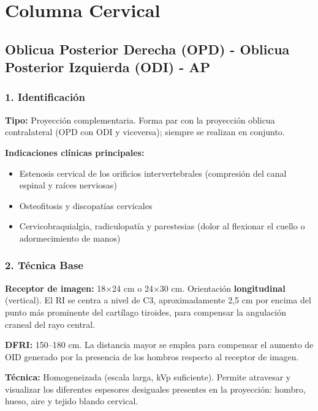 	
	
	\section{Columna Cervical}
	
	\subsection{Oblicua Posterior Derecha (OPD) - Oblicua Posterior Izquierda (ODI) - AP}
	
	\subsubsection*{1. Identificación}
	
	\textbf{Tipo:} Proyección complementaria. Forma par con la proyección oblicua contralateral (OPD con ODI y viceversa); siempre se realizan en conjunto.
	
	\textbf{Indicaciones clínicas principales:}
	\begin{itemize}
		\item Estenosis cervical de los orificios intervertebrales (compresión del canal espinal y raíces nerviosas)
		\item Osteofitosis y discopatías cervicales
		\item Cervicobraquialgia, radiculopatía y parestesias (dolor al flexionar el cuello o adormecimiento de manos)
	\end{itemize}
	
	\subsubsection*{2. Técnica Base}
	
	\textbf{Receptor de imagen:} 18$\times$24 cm o 24$\times$30 cm. Orientación \textbf{longitudinal} (vertical). El RI se centra a nivel de C3, aproximadamente 2{,}5 cm por encima del punto más prominente del cartílago tiroides, para compensar la angulación craneal del rayo central.
	
	\textbf{DFRI:} 150--180 cm. La distancia mayor se emplea para compensar el aumento de OID generado por la presencia de los hombros respecto al receptor de imagen.
	
	\textbf{Técnica:} Homogeneizada (escala larga, kVp suficiente). Permite atravesar y visualizar los diferentes espesores desiguales presentes en la proyección: hombro, hueso, aire y tejido blando cervical.
	
